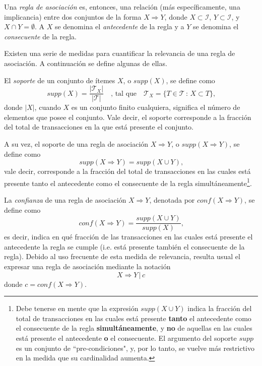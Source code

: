 Una \textit{regla de asociación} es, entonces, una relación (más específicamente, una implicancia) entre dos conjuntos de la forma $X \Rightarrow Y$, donde $X \subset \mathcal{I}$, $Y \subset \mathcal{I}$, y $X \cap Y = \emptyset$. A $X$ se denomina el \textit{antecedente} de la regla y a $Y$ se denomina el \textit{consecuente} de la regla.

Existen una serie de medidas para cuantificar la relevancia de una regla de asociación. A continuación se define algunas de ellas.

El \textit{soporte} de un conjunto de ítemes $X$, o $\mathit{supp}(X)$, se define como $$\mathit{supp}(X) = \frac{|\mathcal{T}_X|}{|\mathcal{T}|} \quad \text{, tal que} \quad \mathcal{T}_X = \{T \in \mathcal{T} \, : \, X \subset T \}\text{,}$$ donde $|X|$, cuando $X$ es un conjunto finito cualquiera, significa el número de elementos que posee el conjunto. Vale decir, el soporte corresponde a la fracción del total de transacciones en la que está presente el conjunto.

A su vez, el soporte de una regla de asociación $X \Rightarrow Y$, o $\mathit{supp}(X \Rightarrow Y)$, se define como $$\mathit{supp}(X \Rightarrow Y) = \mathit{supp}(X \cup Y)\text{,}$$ vale decir, corresponde a la fracción del total de transacciones en las cuales está presente tanto el antecedente como el consecuente de la regla simultáneamente\footnote{Debe tenerse en mente que la expresión $\mathit{supp}(X \cup Y)$ indica la fracción del total de transacciones en las cuales está presente \textbf{tanto} el antecedente como el consecuente de la regla \textbf{simultáneamente}, y \textbf{no} de aquellas en las cuales está presente el antecedente \textbf{o} el consecuente. El argumento del soporte $\mathit{supp}$ es un conjunto de ``pre-condiciones", y, por lo tanto, se vuelve más restrictivo en la medida que su cardinalidad aumenta.}.

La \textit{confianza} de una regla de asociación $X \Rightarrow Y$, denotada por $\mathit{conf}(X \Rightarrow Y)$, se define como $$\mathit{conf}(X \Rightarrow Y) = \frac{\mathit{supp}(X \cup Y)}{\mathit{supp}(X)}\text{,}$$ es decir, indica en qué fracción de las transacciones en las cuales está presente el antecedente la regla se cumple (i.e. está presente también el consecuente de la regla). Debido al uso frecuente de esta medida de relevancia, resulta usual el expresar una regla de asociación mediante la notación $$X \Rightarrow Y \, \Big| \, c$$ donde $c = \mathit{conf}(X \Rightarrow Y)$.

